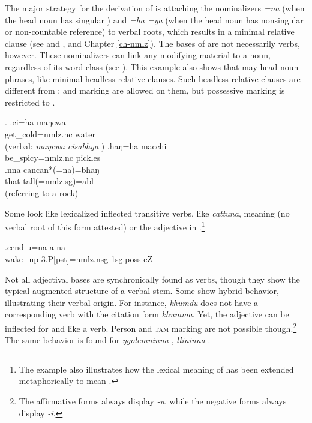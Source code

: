 The major strategy for the derivation of  is attaching the nominalizers \emph{=na} (when the head noun has singular ) and \emph{=ha \ti =ya} (when the head noun has nonsingular  or non-countable reference) to verbal roots, which results in a minimal relative clause (see \Next[a] and \Next[b], and Chapter \ref{ch-nmlz}). The bases of  are not necessarily verbs, however. These nominalizers can link any modifying material to a noun, regardless of its word class (see \Next[c]). This example also shows that  may head noun phrases, like minimal headless relative clauses. Such headless relative clauses are different from ;  and  marking are allowed on them, but possessive marking is restricted to . 

\ex. \ag.ci=ha maŋcwa\\
get\_cold{\sc =nmlz.nc} water\\
 (verbal: \emph{maŋcwa cisabhya} )
	\bg.haŋ=ha macchi\\
	be\_spicy{\sc =nmlz.nc} pickles\\
 	\bg.nna cancan*(=na)=bhaŋ\\
		that tall{\sc *(=nmlz.sg)=abl}\\
	  (referring to a rock)
	
Some  look like  lexicalized inflected transitive verbs, like \emph{cattuna}, meaning   (no verbal root of this form attested) or the adjective in \Next.\footnote{The example also illustrates how the lexical meaning of  has been extended metaphorically to mean .} 
	
	\exg.cend-u=na a-na \\
  wake\_up{\sc -3.P[pst]=nmlz.nsg} {\sc 1sg.poss-}eZ\\
   
  

Not all adjectival bases are synchronically found as verbs, though they show the typical augmented structure of a verbal stem. Some  show hybrid behavior, illustrating their verbal origin. For instance, \emph{khumdu}  does not have a corresponding verb with the citation form \emph{khumma}. Yet, the adjective can be inflected for  and  like a verb. Person and \textsc{tam} marking are not possible though.\footnote{The affirmative forms always display \emph{-u}, while the negative forms always display \emph{-i}.} The same behavior is found for \emph{ŋgolemninna} ,  \emph{llininna} .

